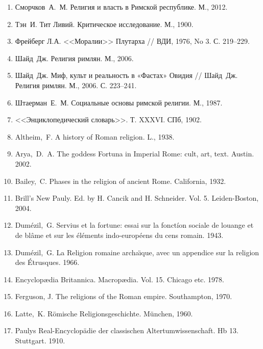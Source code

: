 \begin{flushleft}
\begin{enumerate}
\item Сморчков~А.~М. Религия и власть в Римской республике. М., 2012.

\item Тэн~И. Тит Ливий. Критическое исследование. М., 1900.

\item Фрейберг Л.А. <<Моралии>> Плутарха // ВДИ, 1976, No 3. С. 219--229.

\item Шайд~Дж. Религия римлян. М., 2006.

\item Шайд~Дж. Миф, культ и реальность в «Фастах» Овидия // Шайд~Дж. Религия римлян. М., 2006. С. 223--241.

\item Штаерман~Е.~М. Социальные основы римской религии. М., 1987.

\item <<Энциклопедический словарь>>. Т. XXXVI. СПб, 1902.

\item Altheim,~F. A history of Roman religion. L., 1938.

\item Arya,~D.~A. The goddess Fortuna in Imperial Rome: cult, art, text. Austin. 2002.

\item Bailey,~C. Phases in the religion of ancient Rome. California, 1932.

\item Brill’s New Pauly. Ed. by H. Cancik and H. Schneider. Vol. 5. Leiden-Boston, 2004.

\item Dum\'{e}zil,~G. Servius et la fortune: essai sur la fonctíon sociale de louange et de bl\^{a}me et sur les \'{e}l\'{e}ments indo-europ\'{e}ens du cens romain. 1943.

\item Dum\'{e}zil,~G. La Religion romaine archa\"\i{}que, avec un appendice sur la religion des \'{E}trusques. 1966.

\item Encyclop\ae{}dia Britannica. Macropædia. Vol. 15. Chicago etc. 1978.

\item Ferguson, J. The religions of the Roman empire. Southampton, 1970.

\item Latte,~K. R\"{o}mische Religionsgeschichte. M\"{u}nchen, 1960.

\item Paulys Real-Encyclop\"{a}die der classischen Altertumwissenschaft. Hb 13. Stuttgart. 1910.


\end{enumerate}
\end{flushleft}
